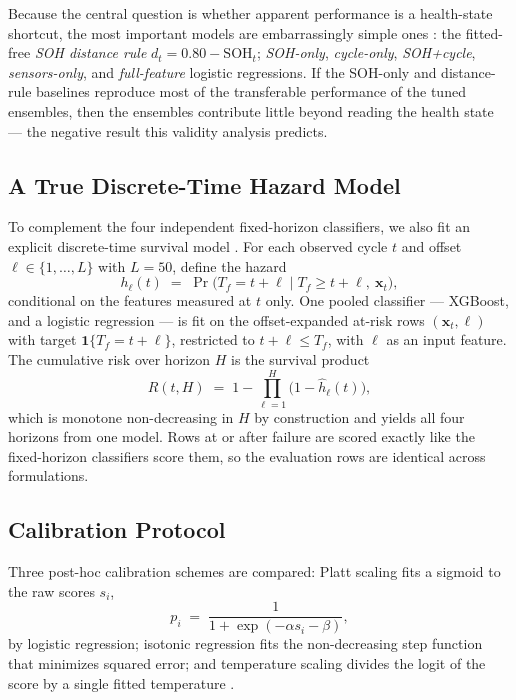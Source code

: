 \documentclass[11pt,a4paper]{article}
\begin{document}
Because the central question is whether apparent performance is a health-state shortcut, the most important models are embarrassingly simple ones \cite{shikdar2026learning}: the fitted-free \emph{SOH distance rule} $d_t = 0.80 - \mathrm{SOH}_t$; \emph{SOH-only}, \emph{cycle-only}, \emph{SOH+cycle}, \emph{sensors-only}, and \emph{full-feature} logistic regressions. If the SOH-only and distance-rule baselines reproduce most of the transferable performance of the tuned ensembles, then the ensembles contribute little beyond reading the health state --- the negative result this validity analysis predicts.

\subsection{A True Discrete-Time Hazard Model}
To complement the four independent fixed-horizon classifiers, we also fit an explicit discrete-time survival model \cite{cox1972regression,kalbfleisch2002statistical}. For each observed cycle $t$ and offset $\ell\in\{1,\dots,L\}$ with $L{=}50$, define the hazard
\begin{equation}\label{eq:hazard}
h_\ell(t) \;=\; \Pr\!\bigl(T_f = t{+}\ell \mid T_f \ge t{+}\ell,\ \mathbf{x}_t\bigr),
\end{equation}
conditional on the features measured at $t$ only. One pooled classifier --- XGBoost, and a logistic regression --- is fit on the offset-expanded at-risk rows $(\mathbf{x}_t, \ell)$ with target $\mathbf{1}\{T_f = t{+}\ell\}$, restricted to $t{+}\ell \le T_f$, with $\ell$ as an input feature. The cumulative risk over horizon $H$ is the survival product
\begin{equation}\label{eq:survival}
R(t,H) \;=\; 1 - \prod_{\ell=1}^{H}\bigl(1-\hat h_\ell(t)\bigr),
\end{equation}
which is monotone non-decreasing in $H$ by construction and yields all four horizons from one model. Rows at or after failure are scored exactly like the fixed-horizon classifiers score them, so the evaluation rows are identical across formulations.

\subsection{Calibration Protocol}
Three post-hoc calibration schemes are compared: Platt scaling fits a sigmoid to the raw scores $s_i$,
\begin{equation}\label{eq:platt}
p_i \;=\; \frac{1}{1+\exp(-\alpha s_i - \beta)},
\end{equation}
by logistic regression; isotonic regression \cite{zadrozny2002transforming} fits the non-decreasing step function that minimizes squared error; and temperature scaling divides the logit of the score by a single fitted temperature \cite{guo2017calibration}.
\end{document}
